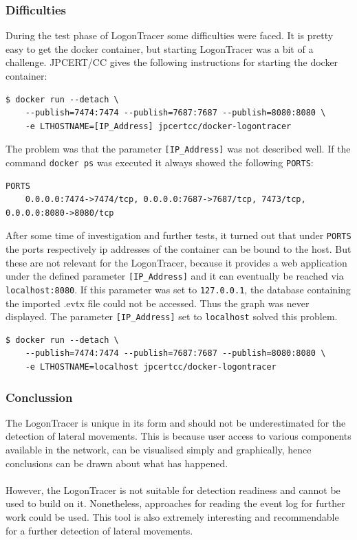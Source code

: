 \subsubsection{Difficulties}
During the test phase of LogonTracer some difficulties were faced. It is pretty easy to get the docker container, but starting LogonTracer was a bit of a challenge. JPCERT/CC gives the following instructions for starting the docker container:
\begin{lstlisting}[language=HTML,caption=LogonTracer: given docker run command]
    $ docker run --detach \
    --publish=7474:7474 --publish=7687:7687 --publish=8080:8080 \
    -e LTHOSTNAME=[IP_Address] jpcertcc/docker-logontracer
\end{lstlisting}
The problem was that the parameter \lstinline|[IP_Address]| was not described well. If the command \lstinline|docker ps| was executed it always showed the following \lstinline|PORTS|:
\begin{lstlisting}[caption=LogonTracer: docker ps (PORTS)]
    PORTS
    0.0.0.0:7474->7474/tcp, 0.0.0.0:7687->7687/tcp, 7473/tcp, 0.0.0.0:8080->8080/tcp
\end{lstlisting}
After some time of investigation and further tests, it turned out that under \lstinline|PORTS| the ports respectively ip addresses of the container can be bound to the host. But these are not relevant for the LogonTracer, because it provides a web application under the defined parameter \lstinline|[IP_Address]| and it can eventually be reached via \lstinline|localhost:8080|. If this parameter was set to \lstinline|127.0.0.1|, the database containing the imported .evtx file could not be accessed. Thus the graph was never displayed. The parameter \lstinline|[IP_Address]| set to \lstinline|localhost| solved this problem.

\begin{lstlisting}[language=HTML,caption=LogonTracer: recommended docker run command]
    $ docker run --detach \
    --publish=7474:7474 --publish=7687:7687 --publish=8080:8080 \
    -e LTHOSTNAME=localhost jpcertcc/docker-logontracer
\end{lstlisting}
\subsubsection{Conclussion}
The LogonTracer is unique in its form and should not be underestimated for the detection of lateral movements. This is because user access to various components available in the network, can be visualised simply and graphically, hence conclusions can be drawn about what has happened.
\\\\
However, the LogonTracer is not suitable for detection readiness and cannot be used to build on it. Nonetheless, approaches for reading the event log for further work could be used. This tool is also extremely interesting and recommendable for a further detection of lateral movements.

